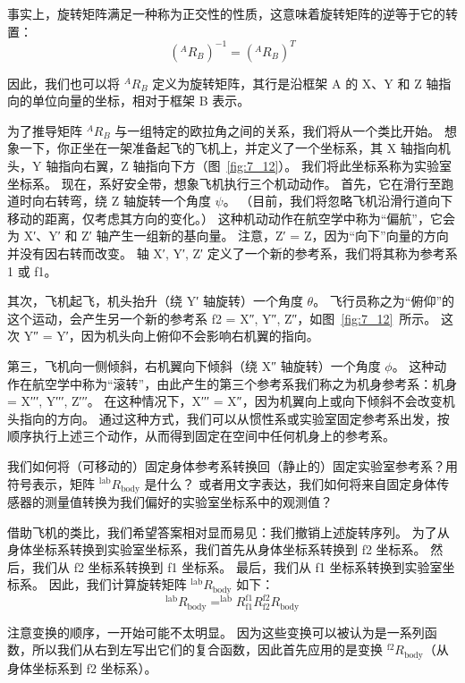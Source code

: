 事实上，旋转矩阵满足一种称为正交性的性质，这意味着旋转矩阵的逆等于它的转置：
%
\begin{equation}
	( ^A R_B )^{-1} = ( ^A R_B )^T
	\label{eq:7_4}
\end{equation}

因此，我们也可以将 $^AR_B$ 定义为旋转矩阵，其行是沿框架 A 的 X、Y 和 Z 轴指向的单位向量的坐标，相对于框架 B 表示。


为了推导矩阵 $^AR_B$ 与一组特定的欧拉角之间的关系，我们将从一个类比开始。
想象一下，你正坐在一架准备起飞的飞机上，并定义了一个坐标系，其 X 轴指向机头，Y 轴指向右翼，Z 轴指向下方（图~\ref{fig:7_12}）。
我们将此坐标系称为实验室坐标系。
现在，系好安全带，想象飞机执行三个机动动作。
首先，它在滑行至跑道时向右转弯，绕 Z 轴旋转一个角度 $\psi$。
（目前，我们将忽略飞机沿滑行道向下移动的距离，仅考虑其方向的变化。）
这种机动动作在航空学中称为“偏航”，它会为 X′、Y′ 和 Z′ 轴产生一组新的基向量。
注意，Z′ = Z，因为“向下”向量的方向并没有因右转而改变。
轴 {X′, Y′, Z′} 定义了一个新的参考系，我们将其称为参考系 1 或 f1。


其次，飞机起飞，机头抬升（绕 Y′ 轴旋转）一个角度 $\theta$。
飞行员称之为“俯仰”的这个运动，会产生另一个新的参考系 f2 = {X″, Y″, Z″}，如图~\ref{fig:7_12}~所示。
这次 Y″ = Y′，因为机头向上俯仰不会影响右机翼的指向。


第三，飞机向一侧倾斜，右机翼向下倾斜（绕 X″ 轴旋转）一个角度 $\phi$。
这种动作在航空学中称为“滚转”，由此产生的第三个参考系我们称之为机身参考系：机身 = {X′′′, Y′′′, Z′′′}。
在这种情况下，X′′′ = X″，因为机翼向上或向下倾斜不会改变机头指向的方向。
通过这种方式，我们可以从惯性系或实验室固定参考系出发，按顺序执行上述三个动作，从而得到固定在空间中任何机身上的参考系。


我们如何将（可移动的）固定身体参考系转换回（静止的）固定实验室参考系？用符号表示，矩阵 $^{\text{lab}}R_{\text{body}}$ 是什么？
或者用文字表达，我们如何将来自固定身体传感器的测量值转换为我们偏好的实验室坐标系中的观测值？


借助飞机的类比，我们希望答案相对显而易见：我们撤销上述旋转序列。
为了从身体坐标系转换到实验室坐标系，我们首先从身体坐标系转换到 f2 坐标系。
然后，我们从 f2 坐标系转换到 f1 坐标系。
最后，我们从 f1 坐标系转换到实验室坐标系。
因此，我们计算旋转矩阵 $^\text{lab}R_\text{body}$ 如下：
%
\begin{equation}
	^\text{lab}R_\text{body} = 
		^\text{lab} R _\text{f1}
		^\text{f1} R _\text{f2}
		^\text{f2} R _\text{body}
	\label{eq:7_5}
\end{equation}


注意变换的顺序，一开始可能不太明显。
因为这些变换可以被认为是一系列函数，所以我们从右到左写出它们的复合函数，因此首先应用的是变换 $^\text{f2}R_\text{body}$（从身体坐标系到 f2 坐标系）。



